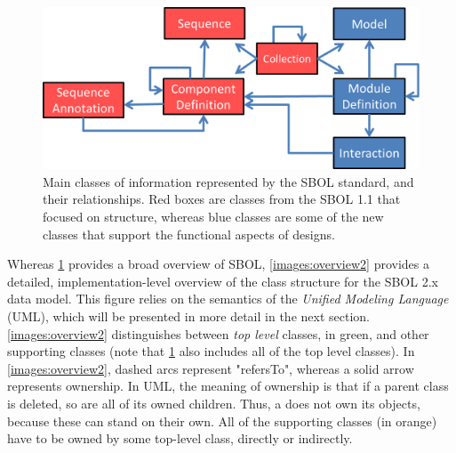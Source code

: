 \begin{figure}[ht]
\begin{center}
\includegraphics[scale=0.7]{images/OverviewFigforSpec-v7.png}
\caption{Main classes of information represented by the SBOL standard, and their relationships.  Red boxes are classes from the SBOL 1.1 that focused on structure, whereas blue classes are some of the new classes that support the functional aspects of designs.}
\label{images:overview1}
\end{center}
\end{figure}

Whereas \ref{images:overview1} provides a broad overview of SBOL, \ref{images:overview2} provides a detailed, implementation-level overview of the class structure for the SBOL 2.x data model. This figure relies on the semantics of the \emph{Unified Modeling Language} (UML), which will be presented in more detail in the next section. \ref{images:overview2} distinguishes between \emph{top level} classes, in green, and other supporting classes (note that \ref{images:overview1} also includes all of the top level classes). In \ref{images:overview2}, dashed arcs represent "refersTo", whereas a solid arrow represents ownership. In UML, the meaning of ownership is that if a parent class is deleted, so are all of its owned children. Thus, a  does not own its
 objects, because these can stand on their own. All of the supporting classes (in orange) have to be owned by some top-level class, directly or indirectly. 


